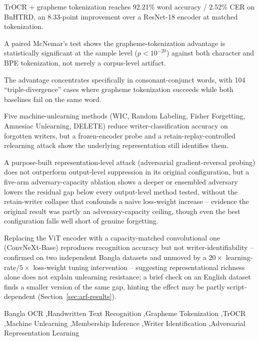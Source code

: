 \documentclass[a4paper,fleqn]{cas-dc}
\begin{document}
\begin{highlights}
\item TrOCR + grapheme tokenization reaches 92.21\% word accuracy / 2.52\% CER on BnHTRD, an 8.33-point improvement over a ResNet-18 encoder at matched tokenization.
\item A paired McNemar's test shows the grapheme-tokenization advantage is statistically significant at the sample level ($p<10^{-20}$) against both character and BPE tokenization, not merely a corpus-level artifact.
\item The advantage concentrates specifically in consonant-conjunct words, with 104 ``triple-divergence'' cases where grapheme tokenization succeeds while both baselines fail on the same word.
\item Five machine-unlearning methods (WIC, Random Labeling, Fisher Forgetting, Amnesiac Unlearning, DELETE) reduce writer-classification accuracy on forgotten writers, but a frozen-encoder probe and a retain-replay-controlled relearning attack show the underlying representation still identifies them.
\item A purpose-built representation-level attack (adversarial gradient-reversal probing) does not outperform output-level suppression in its original configuration, but a five-arm adversary-capacity ablation shows a deeper or ensembled adversary lowers the residual gap below every output-level method tested, without the retain-writer collapse that confounds a naive loss-weight increase -- evidence the original result was partly an adversary-capacity ceiling, though even the best configuration falls well short of genuine forgetting.
\item Replacing the ViT encoder with a capacity-matched convolutional one (ConvNeXt-Base) reproduces recognition accuracy but not writer-identifiability -- confirmed on two independent Bangla datasets and unmoved by a $20\times$ learning-rate/$5\times$ loss-weight tuning intervention -- suggesting representational richness alone does not explain unlearning resistance; a brief check on an English dataset finds a smaller version of the same gap, hinting the effect may be partly script-dependent (Section~\ref{sec:arf-results}).
\end{highlights}

\begin{keywords}
Bangla OCR \sep Handwritten Text Recognition \sep Grapheme Tokenization \sep TrOCR \sep Machine Unlearning \sep Membership Inference \sep Writer Identification \sep Adversarial Representation Learning
\end{keywords}
\end{document}
